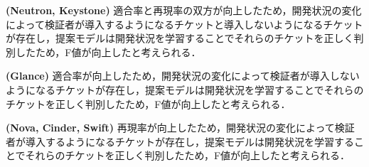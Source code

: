 \documentclass[11pt]{jreport}
\begin{document}
\textbf{ (Neutron, Keystone) }適合率と再現率の双方が向上したため，開発状況の変化によって検証者が導入するようになるチケットと導入しないようになるチケットが存在し，提案モデルは開発状況を学習することでそれらのチケットを正しく判別したため，F値が向上したと考えられる．

\textbf{ (Glance) }適合率が向上したため，開発状況の変化によって検証者が導入しないようになるチケットが存在し，提案モデルは開発状況を学習することでそれらのチケットを正しく判別したため，F値が向上したと考えられる．

\textbf{ (Nova, Cinder, Swift) }再現率が向上したため，開発状況の変化によって検証者が導入するようになるチケットが存在し，提案モデルは開発状況を学習することでそれらのチケットを正しく判別したため，F値が向上したと考えられる．


\end{document}
